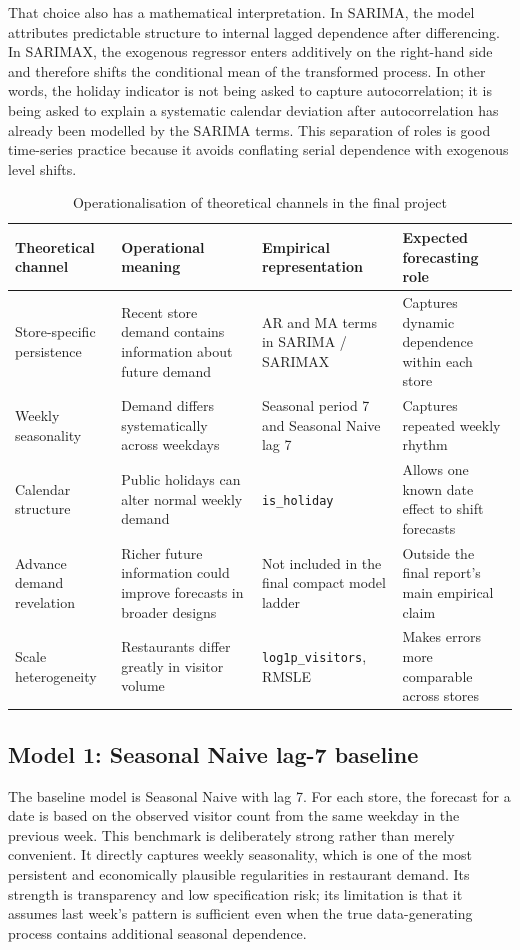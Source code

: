 \documentclass[11pt,oneside]{scrartcl}
\begin{document}
That choice also has a mathematical interpretation. In SARIMA, the model attributes predictable structure to internal lagged dependence after differencing. In SARIMAX, the exogenous regressor enters additively on the right-hand side and therefore shifts the conditional mean of the transformed process. In other words, the holiday indicator is not being asked to capture autocorrelation; it is being asked to explain a systematic calendar deviation after autocorrelation has already been modelled by the SARIMA terms. This separation of roles is good time-series practice because it avoids conflating serial dependence with exogenous level shifts.

\begin{table}[H]
\centering
\caption{Operationalisation of theoretical channels in the final project}
\begin{tabularx}{\textwidth}{>{\raggedright\arraybackslash}p{} >{\raggedright\arraybackslash}p{} >{\raggedright\arraybackslash}p{} >{\raggedright\arraybackslash}X}
\toprule
Theoretical channel & Operational meaning & Empirical representation & Expected forecasting role \\
\midrule
Store-specific persistence & Recent store demand contains information about future demand & AR and MA terms in SARIMA / SARIMAX & Captures dynamic dependence within each store \\
Weekly seasonality & Demand differs systematically across weekdays & Seasonal period 7 and Seasonal Naive lag 7 & Captures repeated weekly rhythm \\
Calendar structure & Public holidays can alter normal weekly demand & \texttt{is\_holiday} & Allows one known date effect to shift forecasts \\
Advance demand revelation & Richer future information could improve forecasts in broader designs & Not included in the final compact model ladder & Outside the final report's main empirical claim \\
Scale heterogeneity & Restaurants differ greatly in visitor volume & \texttt{log1p\_visitors}, RMSLE & Makes errors more comparable across stores \\
\bottomrule
\end{tabularx}
\end{table}

\subsection{Model 1: Seasonal Naive lag-7 baseline}
The baseline model is Seasonal Naive with lag 7. For each store, the forecast for a date is based on the observed visitor count from the same weekday in the previous week. This benchmark is deliberately strong rather than merely convenient. It directly captures weekly seasonality, which is one of the most persistent and economically plausible regularities in restaurant demand. Its strength is transparency and low specification risk; its limitation is that it assumes last week's pattern is sufficient even when the true data-generating process contains additional seasonal dependence.
\end{document}
